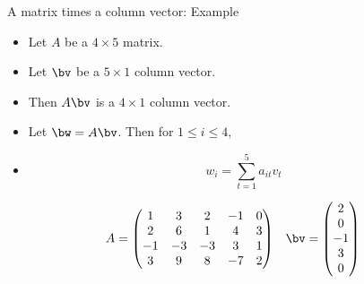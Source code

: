 \documentclass{beamer}
\begin{document}
\begin{frame}{A matrix times a column vector: Example}

\begin{itemize}
\item Let $A$ be a $4 \times 5$ matrix.
\item Let $\bv$ be a $5\times 1$ column vector.
\item Then $A \bv$ is a $4 \times 1$ column vector.
\item Let $\bw=A \bv$. Then for $1\leq i \leq 4$,
\item $$w_i = \sum_{t=1}^5 a_{it} v_{t}$$
\end{itemize}

$$
\begin{matrix}
A =

\begin{pmatrix}
1 & 3 & 2 & -1 & 0 \\
2 & 6 & 1 & 4 & 3\\
-1 & -3 & -3 & 3 & 1 \\
3 & 9 & 8 & -7 & 2
\end{pmatrix}

&

\bv =

\begin{pmatrix}
2 \\ 0 \\ -1 \\ 3 \\ 0
\end{pmatrix}
\end{matrix}
$$

\end{frame}

\end{document}
